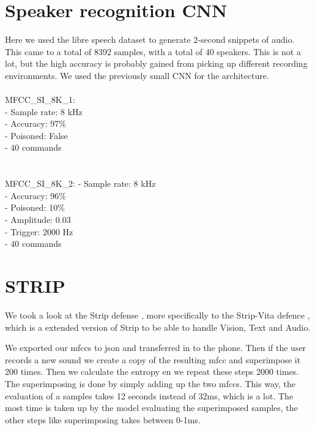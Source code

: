 \documentclass{report}
\theoremstyle{definition}
\theoremstyle{remark}
\begin{document}
\section{Speaker recognition CNN}
Here we used the libre speech dataset to generate 2-second snippets of audio. This came to a total of 8392 samples, with a total of 40 speakers. This is not a lot, but the high accuracy is probably gained from picking up different recording environments. We used the previously small CNN for the architecture.
\\\\
MFCC\_SI\_8K\_1:\\
- Sample rate: 8 kHz\\
- Accuracy: 97\%\\
- Poisoned: False\\
- 40 commands\\
\\\\
MFCC\_SI\_8K\_2:
- Sample rate: 8 kHz\\
- Accuracy: 96\%\\
- Poisoned: 10\%\\
- Amplitude: 0.03\\
- Trigger: 2000 Hz\\
- 40 commands\\


\section{STRIP \label{STRIP}}
We took a look at the Strip defense \cite{Strip}, more specifically to the Strip-Vita defence \cite{StripVita}, which is a extended version of Strip to be able to handle Vision, Text and Audio. 



We exported our mfccs to json and transferred in to the phone. Then if the user records a new sound we create a copy of the resulting mfcc and superimpose it 200 times. Then we calculate the entropy en we repeat these steps 2000 times. The superimposing is done by simply adding up the two mfccs. This way, the evaluation of a samples takes 12 seconds instead of 32ms, which is a lot. The most time is taken up by the model evaluating the superimposed samples, the other steps like superimposing takes between 0-1ms. 
\end{document}
